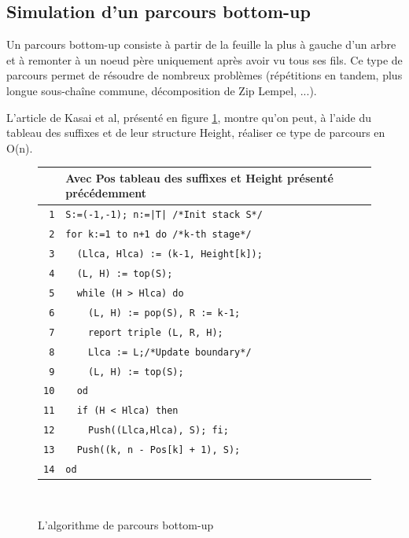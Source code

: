 \documentclass[a4paper,11pt]{article}
\begin{document}
\subsection{Simulation d'un parcours bottom-up}
\label{sec:bottomup}

Un parcours bottom-up consiste à partir de la feuille la plus à gauche
d'un arbre et à remonter à un noeud père uniquement après avoir vu
tous ses fils. Ce type de parcours permet de résoudre de nombreux
problèmes (répétitions en tandem, plus longue sous-chaîne commune,
décomposition de Zip Lempel, ...)\cite{Abouelhoda200453}.

L'article de Kasai et al, présenté en figure \ref{fig:bottomupalgo},
montre qu'on peut, à l'aide du tableau des suffixes et de leur
structure Height, réaliser ce type de parcours en O(n).


\begin{figure}
  \centering
        \begin{tabular}{r|l}
         & Avec Pos tableau des suffixes et Height présenté
         précédemment\\
         \hline
        \texttt{1}  & \verb!S:=(-1,-1); n:=|T| /*Init stack S*/!\\
        \texttt{2}  & \verb!for k:=1 to n+1 do /*k-th stage*/!\\
        \texttt{3}  & \verb!  (Llca, Hlca) := (k-1, Height[k]);!\\
        \texttt{4}  & \verb!  (L, H) := top(S);!\\
        \texttt{5}  & \verb!  while (H > Hlca) do!\\
        \texttt{6}  & \verb!    (L, H) := pop(S), R := k-1;!\\
        \texttt{7}  & \verb!    report triple (L, R, H);!\\
        \texttt{8}  & \verb!    Llca := L;/*Update boundary*/!\\
        \texttt{9}  & \verb!    (L, H) := top(S);!\\
        \texttt{10} & \verb!  od!\\
        \texttt{11} & \verb!  if (H < Hlca) then!\\
        \texttt{12} & \verb!    Push((Llca,Hlca), S); fi;!\\
        \texttt{13} & \verb!  Push((k, n - Pos[k] + 1), S);!\\
        \texttt{14} & \verb!od!\\
      \end{tabular}\\
  \caption{L'algorithme de parcours bottom-up}
  \label{fig:bottomupalgo}
\end{figure}
\end{document}

